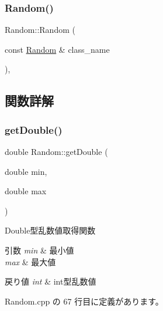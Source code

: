 \subsubsection{\texorpdfstring{Random()}{Random()}\hspace{0.1cm}{\footnotesize\ttfamily [2/2]}}
{\footnotesize\ttfamily Random\+::\+Random (\begin{DoxyParamCaption}\item[{const \mbox{\hyperlink{class_random}{Random}} \&}]{class\+\_\+name }\end{DoxyParamCaption})\hspace{0.3cm}{\ttfamily [private]}, {\ttfamily [delete]}}



\subsection{関数詳解}
\mbox{\label{class_random_a90608f1db0e83ce6dcf7a5df43bce02e}} 
\subsubsection{\texorpdfstring{get\+Double()}{getDouble()}}
{\footnotesize\ttfamily double Random\+::get\+Double (\begin{DoxyParamCaption}\item[{double}]{min,  }\item[{double}]{max }\end{DoxyParamCaption})}



Double型乱数値取得関数 


\begin{DoxyParams}{引数}
{\em min} & 最小値 \\
\hline
{\em max} & 最大値 \\
\hline
\end{DoxyParams}

\begin{DoxyRetVals}{戻り値}
{\em int} & int型乱数値 \\
\hline
\end{DoxyRetVals}


 Random.\+cpp の 67 行目に定義があります。

\mbox{\label{class_random_a7c208cfc4a9859dbf23bd45e73e26ffa}} 
